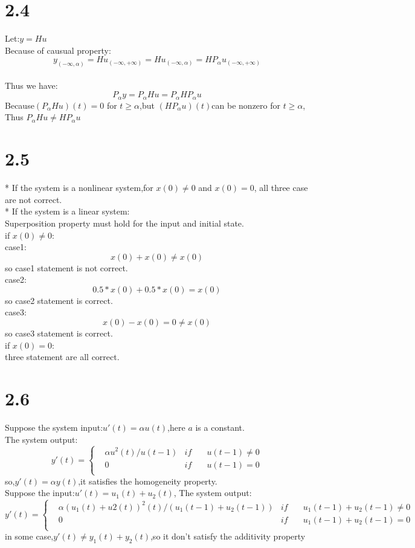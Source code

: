 \documentclass{article}
\begin{document}
\section*{2.4}
Let:$y=Hu$\\
Because of causual property:
\[y_{(- \infty,\alpha)}=Hu_{(-\infty,+\infty)}=Hu_{(-\infty,\alpha)}=HP_\alpha u_{(-\infty,+\infty)}\]\\
Thus we have:
\[P_\alpha y=P_\alpha Hu=P_\alpha HP_\alpha u\]
Because$(P_\alpha Hu)(t)=0$ for $t\geq\alpha$,but $(HP_\alpha u)(t)$can be nonzero for $t \geq\alpha$,
Thus $P_\alpha Hu \neq HP_\alpha u$


\section*{2.5}
* If the system is a nonlinear system,for $x(0) \neq 0$ and $x(0)=0$, all three case are not correct.\\
* If the system is a linear system:\\
\indent Superposition property must hold for the input and initial state.\\
\indent if $x(0) \neq 0$:\\
\indent \indent case1:
\[x(0)+x(0)\neq x(0)\]
\indent \indent so case1 statement is not correct.\\
\indent \indent case2:
\[0.5*x(0)+0.5*x(0)=x(0)\]
\indent \indent so case2 statement is correct.\\
\indent \indent case3:
\[x(0)-x(0)=0 \neq x(0)\]
\indent \indent so case3 statement is correct.\\
\indent if $x(0) = 0$:\\
\indent \indent three statement are all correct.\\

\section*{2.6}
Suppose the system input:$u'(t)=\alpha u(t)$,here $a$ is a constant.\\
The system output:
\[y'(t)=\left\{
\begin{aligned}
&\alpha u^2(t)/u(t-1)& if\quad& u(t-1) \neq 0\\
&0&if\quad&u(t-1)=0\\
\end{aligned}
\right.\]
so,$y'(t)=\alpha y(t)$,it satisfies the homogeneity property.\\
Suppose the input:$u'(t)=u_1(t)+u_2(t)$,
The system output:
\[y'(t)=\left\{
\begin{aligned}
&\alpha (u_1(t)+u2(t))^2(t)/(u_1(t-1)+u_2(t-1))& if\quad& u_1(t-1)+u_2(t-1) \neq 0\\
&0&if\quad&u_1(t-1)+u_2(t-1)=0\\
\end{aligned}
\right.\]
in some case,$y'(t) \neq y_1(t)+y_2(t)$,so it don't satisfy the additivity property
\end{document}

